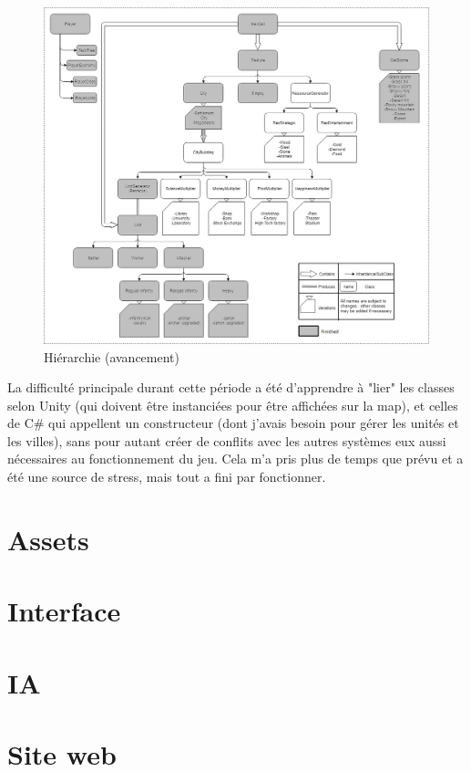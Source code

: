 \documentclass[12pt]{report}
\begin{document}
\begin{figure}[H]
    \centering
    \includegraphics[width=1\textwidth]{class_hierarchy}
    \caption{Hiérarchie (avancement)}
\end{figure}

La difficulté principale durant cette période a été d'apprendre à "lier" les
classes selon Unity (qui doivent être instanciées pour être affichées sur la
map), et celles de C\# qui appellent un constructeur (dont j'avais besoin pour
gérer les unités et les villes), sans pour autant créer de conflits avec les
autres systèmes eux aussi nécessaires au fonctionnement du jeu. Cela m'a pris
plus de temps que prévu et a été une source de stress, mais tout a fini par
fonctionner.

\section*{Assets}

\section*{Interface}

\section*{IA}

\section*{Site web}
\end{document}
